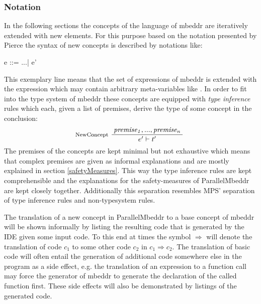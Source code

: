 \subsubsection{Notation}
In the following sections the concepts of the language of mbeddr are iteratively extended with new elements. For this purpose based on the notation presented by Pierce\cite{TypesAndProgrammingLanguages} the syntax of new concepts is described by notations like:
\begin{ccode}
e ::= ...| e'
\end{ccode}
This exemplary line means that the set of expressions of mbeddr is extended with the expression  which may contain arbitrary meta-variables like . In order to fit into the type system of mbeddr these concepts are equipped with \textit{type inference} rules which each, given a list of premises, derive the type of some concept in the conclusion:
\begin{align*}
\inference*[NewConcept]{\mathit{premise_1}, ..., \mathit{premise_n}}{\qquad\quad e' |- t' \qquad\quad} 
\end{align*}
The premises of the concepts are kept minimal but not exhaustive which means that complex premises are given as informal explanations and are mostly explained in section \ref{safetyMeasures}. This way the type inference rules are kept comprehensible and the explanations for the safety-measures of ParallelMbeddr are kept closely together. Additionally this separation resembles MPS' separation of type inference rules and non-typesystem rules.

The translation of a new concept in ParallelMbeddr to a base concept of mbeddr will be shown informally by listing the resulting code that is generated by the IDE given some input code. To this end at times the symbol $\Longrightarrow$ will denote the translation of code $c_1$ to some other code $c_2$ in $c_1 \Longrightarrow c_2$. The translation of basic code will often entail the generation of additional code somewhere else in the program as a side effect, e.g. the translation of an expression to a function call may force the generator of mbeddr to generate the declaration of the called function first. These side effects will also be demonstrated by listings of the generated code.